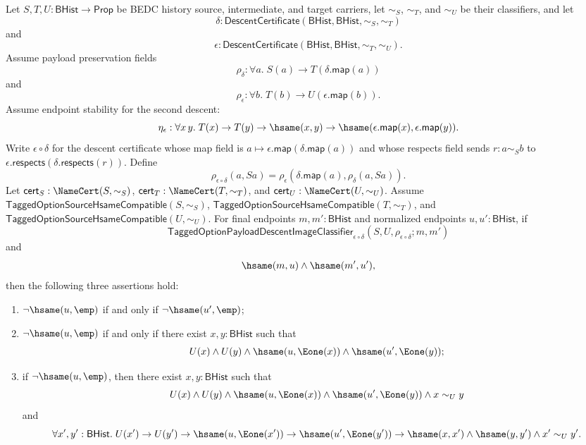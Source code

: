 \begin{theorem}
Let $S,T,U:\mathsf{BHist}\to\mathsf{Prop}$ be BEDC history source,
intermediate, and target carriers, let $\sim_S$, $\sim_T$, and $\sim_U$ be their
classifiers, and let
$$
\delta:\mathsf{DescentCertificate}(\mathsf{BHist},\mathsf{BHist},\sim_S,\sim_T)
$$
and
$$
\epsilon:\mathsf{DescentCertificate}(\mathsf{BHist},\mathsf{BHist},\sim_T,\sim_U).
$$
Assume payload preservation fields
$$
\rho_{\delta}:\forall a.\;S(a)\to T(\delta.\mathsf{map}(a))
$$
and
$$
\rho_{\epsilon}:\forall b.\;T(b)\to U(\epsilon.\mathsf{map}(b)).
$$
Assume endpoint stability for the second descent:
$$
\eta_{\epsilon}:\forall x\,y.\;
T(x)\to T(y)\to \hsame(x,y)\to
\hsame(\epsilon.\mathsf{map}(x),\epsilon.\mathsf{map}(y)).
$$
Write $\epsilon\circ\delta$ for the descent certificate whose map field is
$a\mapsto\epsilon.\mathsf{map}(\delta.\mathsf{map}(a))$ and whose respects field
sends $r:a\sim_S b$ to
$\epsilon.\mathsf{respects}(\delta.\mathsf{respects}(r))$. Define
$$
\rho_{\epsilon\circ\delta}(a,Sa)=
\rho_{\epsilon}(\delta.\mathsf{map}(a),\rho_{\delta}(a,Sa)).
$$
Let $\mathsf{cert}_S:\NameCert(S,\sim_S)$,
$\mathsf{cert}_T:\NameCert(T,\sim_T)$, and
$\mathsf{cert}_U:\NameCert(U,\sim_U)$. Assume
$\mathsf{TaggedOptionSourceHsameCompatible}(S,\sim_S)$,
$\mathsf{TaggedOptionSourceHsameCompatible}(T,\sim_T)$, and
$\mathsf{TaggedOptionSourceHsameCompatible}(U,\sim_U)$. For final endpoints
$m,m':\mathsf{BHist}$ and normalized endpoints $u,u':\mathsf{BHist}$, if
$$
\mathsf{TaggedOptionPayloadDescentImageClassifier}_{\epsilon\circ\delta}
(S,U,\rho_{\epsilon\circ\delta};m,m')
$$
and
$$
\hsame(m,u)\land \hsame(m',u'),
$$
then the following three assertions hold:
\begin{enumerate}
\item $\neg\hsame(u,\emp)$ if and only if $\neg\hsame(u',\emp)$;
\item $\neg\hsame(u,\emp)$ if and only if there exist $x,y:\mathsf{BHist}$
such that
$$
U(x)\land U(y)\land
\hsame(u,\Eone(x))\land
\hsame(u',\Eone(y));
$$
\item if $\neg\hsame(u,\emp)$, then there exist $x,y:\mathsf{BHist}$ such that
$$
U(x)\land U(y)\land
\hsame(u,\Eone(x))\land
\hsame(u',\Eone(y))\land
x\sim_U y
$$
and
$$
\forall x',y':\mathsf{BHist}.\;
U(x')\to U(y')\to
\hsame(u,\Eone(x'))\to
\hsame(u',\Eone(y'))\to
\hsame(x,x')\land \hsame(y,y')\land x'\sim_U y'.
$$
\end{enumerate}
\end{theorem}
